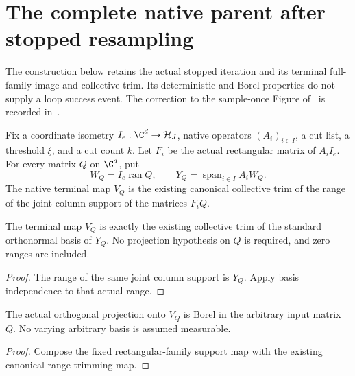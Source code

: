 \section{The complete native parent after stopped resampling}

The construction below retains the actual stopped iteration and its
terminal full-family image and collective trim. Its deterministic and Borel
properties do not supply a loop success event. The correction to the
sample-once Figure of~\cite[lines 1664--1673]{Arad2016RigorousRG} is
recorded in~\cite{gap:alvv16_bootstrap_constants}.

\begin{definition}
    \label{def:native_family_image_trim}
    \leanok
    Fix a coordinate isometry $I_e:\C^d\to\mathcal H_J$, native operators
    $(A_i)_{i\in I}$, a cut list, a threshold $\xi$, and a cut count $k$.
    Let $F_i$ be the actual rectangular matrix of $A_iI_e$. For every matrix
    $Q$ on $\C^d$, put
    \[
        W_Q=I_e\operatorname{ran}Q,\qquad
        Y_Q=\operatorname{span}_{i\in I}A_iW_Q.
    \]
    The native terminal map $V_Q$ is the existing canonical collective trim
    of the range of the joint column support of the matrices $F_iQ$.
\end{definition}

\begin{lemma}
    \label{lem:native_family_terminal_trim_identity}
    \leanok
    The terminal map $V_Q$ is exactly the existing collective trim of the
    standard orthonormal basis of $Y_Q$. No projection hypothesis on $Q$
    is required, and zero ranges are included.
\end{lemma}
\begin{proof}\leanok
    The range of the same joint column support is $Y_Q$. Apply basis
    independence to that actual range.
\end{proof}

\begin{lemma}
    \label{lem:borel_native_family_terminal_trim}
    \leanok
    The actual orthogonal projection onto $V_Q$ is Borel in the arbitrary
    input matrix $Q$. No varying arbitrary basis is assumed measurable.
\end{lemma}
\begin{proof}\leanok
    Compose the fixed rectangular-family support map with the existing
    canonical range-trimming map.
\end{proof}

